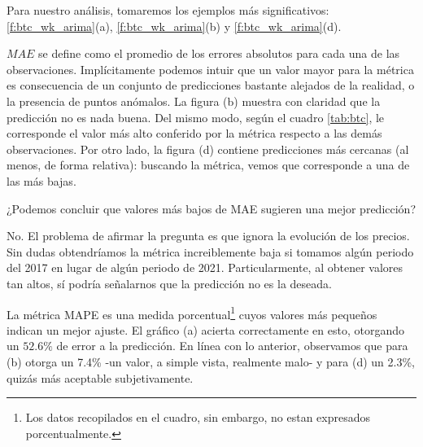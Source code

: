 \documentclass[a4paper,10pt]{article}
\begin{document}
Para nuestro análisis, tomaremos los ejemplos más significativos: \ref{f:btc_wk_arima}(a), \ref{f:btc_wk_arima}(b) y \ref{f:btc_wk_arima}(d).

$MAE$ se define como el promedio de los errores absolutos para cada una de las observaciones. Implícitamente podemos intuir que un valor mayor para la métrica es consecuencia de un conjunto de predicciones bastante alejados de la realidad, o la presencia de puntos anómalos. La figura (b) muestra con claridad que la predicción no es nada buena. Del mismo modo, según el cuadro \ref{tab:btc}, le corresponde el valor más alto conferido por la métrica respecto a las demás observaciones. Por otro lado, la figura (d) contiene predicciones más cercanas (al menos, de forma relativa): buscando la métrica, vemos que corresponde a una de las más bajas.

¿Podemos concluir que valores más bajos de MAE sugieren una mejor predicción?

No. El problema de afirmar la pregunta es que ignora la evolución de los precios. Sin dudas obtendríamos la métrica increiblemente baja si tomamos algún periodo del 2017 en lugar de algún periodo de 2021. Particularmente, al obtener valores tan altos, sí podría señalarnos que la predicción no es la deseada.

La métrica MAPE es una medida porcentual\footnote{Los datos recopilados en el cuadro, sin embargo, no estan expresados porcentualmente.} cuyos valores más pequeños indican un mejor ajuste. El gráfico (a) acierta correctamente en esto, otorgando un $52.6\%$ de error a la predicción. En línea con lo anterior, observamos que para (b) otorga un 7.4\% -un valor, a simple vista, realmente malo- y para (d) un 2.3\%, quizás más aceptable subjetivamente.
\end{document}
